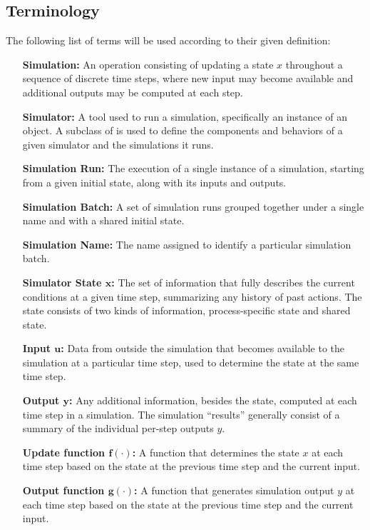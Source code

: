 \documentclass[12pt]{article}
\newcommand{\mpsim}[0]{{MP-Sim}}
\newcommand{\code}[1]{{\relsize{-0.5}{\tt{{#1}}}}}  %
\numberwithin{equation}{section}
\numberwithin{table}{section}
\numberwithin{figure}{section}
\begin{document}

\subsection{Terminology}
The following list of terms will be used according to their given definition:
\begin{itemize}
\item[\bf Simulation:] An operation consisting of updating a state $x$ throughout a sequence of discrete time steps, where new input may become available and additional outputs may be computed at each step.
\item[\bf Simulator:] A tool used to run a simulation, specifically an instance of an \code{mpsim} object. A subclass of \code{mpsim} is used to define the components and behaviors of a given simulator and the simulations it runs.
\item[\bf Simulation Run:] The execution of a single instance of a simulation, starting from a given initial state, along with its inputs and outputs.
\item[\bf Simulation Batch:] A set of simulation runs grouped together under a single name and with a shared initial state.
\item[\bf Simulation Name:] The name assigned to identify a particular simulation batch.
\item[\bf Simulator State $\boldsymbol{x}$:] The set of information that fully describes the current conditions at a given time step, summarizing any history of past actions. The state consists of two kinds of information, process-specific state and shared state.
\item[\bf Input $\boldsymbol{u}$:] Data from outside the simulation that becomes available to the simulation at a particular time step, used to determine the state at the same time step.
\item[\bf Output $\boldsymbol{y}$:] Any additional information, besides the state, computed at each time step in a simulation. The simulation ``results'' generally consist of a summary of the individual per-step outputs $y$.
\item[\bf Update function $\boldsymbol{f(\cdot)}$:] A function that determines the state $x$ at each time step based on the state at the previous time step and the current input.
\item[\bf Output function $\boldsymbol{g(\cdot)}$:] A function that generates simulation output $y$ at each time step based on the state at the previous time step and the current input.

\end{itemize}
\end{document}
